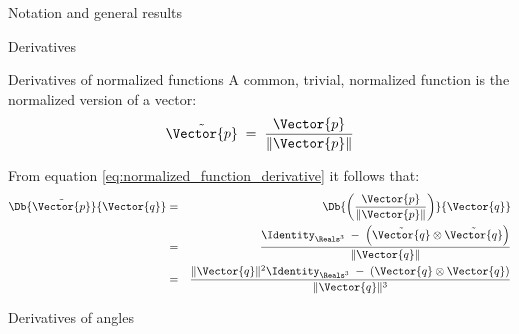 \begin{plSection}{Notation and general results}
\begin{plSection}{Derivatives}
\begin{plSection}{Derivatives of normalized functions}
A common, trivial, normalized function is the normalized version of
a vector:
\begin{equation}
\tilde{\Vector{p}} \;= \;{{\Vector{p}} \over {\| \Vector{p} \|}}
\end{equation}

From equation \cref{eq:normalized_function_derivative}
it follows that:
\begin{eqnarray}
\label{eq:normalized_vector_derivative}
\Db{\tilde{\Vector{p}}}{\Vector{q}}
& = &
\Db{\left({\Vector{p} \over {\| \Vector{p} \|}}\right)}{\Vector{q}}
\\
& = &
{{\Identity_{\Reals^3} \;- \;\left( \tilde{\Vector{q}} \otimes \tilde{\Vector{q}} \right) }
\over {\| \Vector{q} \|} }
\nonumber
\\
& = &
{{\| \Vector{q} \|^2 \Identity_{\Reals^3} \;- \;\left( \Vector{q} \otimes \Vector{q} \right) }
\over {\| \Vector{q} \|^3} }
\nonumber
\end{eqnarray}

\end{plSection}%
\begin{plSection}{Derivatives of angles}
\label{sec:derivatives-of-angles}


\end{plSection}
\end{plSection}
\end{plSection}
